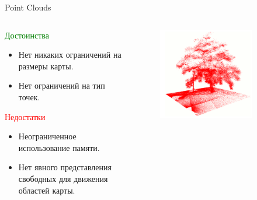 \documentclass[9pt]{beamer}
\begin{document}
\begin{frame}{Point Clouds}
\begin{columns}
\begin{column}{0.50\textwidth}
  \begin{block}{\textcolor{green}{Достоинства}}
    \begin{itemize}
    \item
    { 
      Нет никаких ограничений на размеры карты.
    }
    \item
    {
      Нет ограничений на тип точек.
    }
    \end{itemize}
  \end{block}

  \begin{block}{\textcolor{red}{Недостатки}}
    \begin{itemize}
    \item
    { 
      Неограниченное использование памяти.
    }
    \item
    {
      Нет явного представления свободных для движения областей карты.
    }
    \end{itemize}
  \end{block}
\end{column}
\begin{column}{0.50\textwidth}
\begin{figure}[h]
    \centering
    \includegraphics[width=0.8\textwidth]{point_cloud_tree.png}
\end{figure}
\end{column}
\end{columns}
\end{frame}
\end{document}
